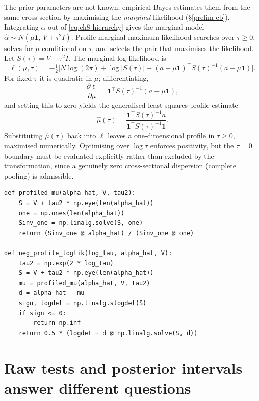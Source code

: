 The prior parameters are not known; empirical Bayes estimates them from the
same cross-section by maximising the \emph{marginal} likelihood
(\S\ref{prelim-eb}). Integrating $\alpha$ out of \eqref{eq:ch8-hierarchy}
gives the marginal model $\hat\alpha\sim N(\mu\mathbf{1},\,V+\tau^2 I)$.
Profile marginal maximum likelihood searches over $\tau\ge0$, solves for
$\mu$ conditional on $\tau$, and selects the pair that maximises the
likelihood. Let $S(\tau)=V+\tau^2 I$. The marginal log-likelihood is
\begin{equation}\label{eq:ch8-marglik}
\ell(\mu,\tau) = -\tfrac12\bigl[N\log(2\pi)+\log\lvert S(\tau)\rvert
 + (a-\mu\mathbf{1})^{\top}S(\tau)^{-1}(a-\mu\mathbf{1})\bigr].
\end{equation}
For fixed $\tau$ it is quadratic in $\mu$; differentiating,
\begin{equation}\label{eq:ch8-dmu}
\frac{\partial\ell}{\partial\mu} = \mathbf{1}^{\top}S(\tau)^{-1}(a-\mu\mathbf{1}),
\end{equation}
and setting this to zero yields the generalised-least-squares profile
estimate
\begin{equation}\label{eq:ch8-mu}
\hat\mu(\tau) = \frac{\mathbf{1}^{\top}S(\tau)^{-1}a}{\mathbf{1}^{\top}S(\tau)^{-1}\mathbf{1}} .
\end{equation}
Substituting $\hat\mu(\tau)$ back into $\ell$ leaves a one-dimensional
profile in $\tau\ge0$, maximised numerically. Optimising over $\log\tau$
enforces positivity, but the $\tau=0$ boundary must be evaluated
explicitly rather than excluded by the transformation, since a genuinely
zero cross-sectional dispersion (complete pooling) is admissible.

\begin{verbatim}
def profiled_mu(alpha_hat, V, tau2):
    S = V + tau2 * np.eye(len(alpha_hat))
    one = np.ones(len(alpha_hat))
    Sinv_one = np.linalg.solve(S, one)
    return (Sinv_one @ alpha_hat) / (Sinv_one @ one)

def neg_profile_loglik(log_tau, alpha_hat, V):
    tau2 = np.exp(2 * log_tau)
    S = V + tau2 * np.eye(len(alpha_hat))
    mu = profiled_mu(alpha_hat, V, tau2)
    d = alpha_hat - mu
    sign, logdet = np.linalg.slogdet(S)
    if sign <= 0:
        return np.inf
    return 0.5 * (logdet + d @ np.linalg.solve(S, d))
\end{verbatim}

\hypertarget{raw-tests-and-posterior-intervals-answer-different-questions}{%
\section{Raw tests and posterior intervals answer different
questions}\label{raw-tests-and-posterior-intervals-answer-different-questions}}


